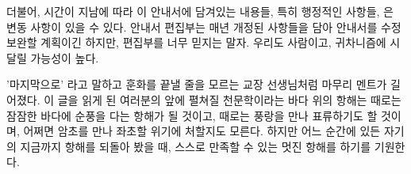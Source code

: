 더불어, 시간이 지남에 따라 이 안내서에 담겨있는 내용들, 특히 행정적인 사항들, 은
변동 사항이 있을 수 있다. 안내서 편집부는 매년 개정된 사항들을 담아 안내서를 수정
보완할 계획이긴 하지만, 편집부를 너무 믿지는 말자. 우리도 사람이고, 귀차니즘에
시달릴 가능성이 높다.  \vspace{\baselineskip}

'마지막으로' 라고 말하고 훈화를 끝낼 줄을 모르는 교장 선생님처럼 마무리 멘트가
길어졌다. 이 글을 읽게 된 여러분의 앞에 펼쳐질 천문학이라는 바다 위의 항해는
때로는 잠잠한 바다에 순풍을 다는 항해가 될 것이고, 때로는 풍랑을 만나 표류하기도
할 것이며, 어쩌면 암초를 만나 좌초할 위기에 처할지도 모른다. 하지만 어느 순간에
있든 자기의 지금까지 항해를 되돌아 봤을 때, 스스로 만족할 수 있는 멋진 항해를
하기를 기원한다.